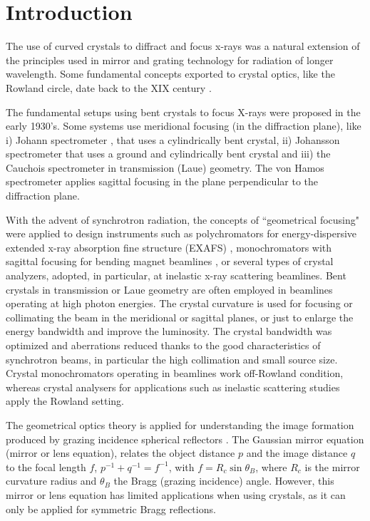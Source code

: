 \documentclass[preprint]{iucr}              %
\begin{document}
\section{Introduction}

The use of curved crystals to diffract and focus x-rays was a natural extension of the principles used in mirror and grating technology for radiation of longer wavelength. Some fundamental concepts exported to crystal optics, like the Rowland circle, date back to the XIX century \cite{rowland1882}.

The fundamental setups using bent crystals to focus X-rays were proposed in the early 1930’s. Some systems use meridional focusing (in the diffraction plane), like i) Johann spectrometer \cite{Johann1931}, that uses a cylindrically bent crystal,  ii) Johansson spectrometer \cite{Johansson1933} that uses a ground and cylindrically bent crystal and iii) the Cauchois spectrometer \cite{cauchois1933} in transmission (Laue) geometry. The von Hamos spectrometer \cite{V.Hamos1933} applies sagittal focusing in the plane perpendicular to the diffraction plane.

With the advent of synchrotron radiation, the concepts of ``geometrical focusing" were applied to design instruments such as polychromators for energy-dispersive extended x-ray absorption fine structure (EXAFS) \cite{Tolentino:ms0206}, monochromators with sagittal focusing for bending magnet beamlines \cite{Sparks1980}, or several types of crystal analyzers, adopted, in particular, at inelastic x-ray scattering beamlines. Bent crystals in transmission or Laue geometry are often employed in beamlines operating at high photon energies. The crystal curvature is used for focusing or collimating the beam in the meridional \cite{Suortti1988,SuorttiShulze} or sagittal \cite{Zhong2001} planes, or just to enlarge the energy bandwidth and improve the luminosity. The crystal bandwidth was optimized and aberrations reduced thanks to the good characteristics of synchrotron beams, in particular the high collimation and small source size. Crystal monochromators operating in beamlines work off-Rowland condition, whereas crystal analysers for applications such as inelastic scattering studies apply the Rowland setting.

The geometrical optics theory is applied for understanding the image formation produced by grazing incidence spherical reflectors \cite{KB1948}. The Gaussian mirror equation (mirror or lens equation), relates the object distance $p$ and the image distance $q$ to the focal length $f$, $p^{-1}+q^{-1}=f^{-1}$, with $f=R_c \sin\theta_B$, where $R_c$ is the mirror curvature radius and $\theta_B$ the Bragg (grazing incidence) angle. However, this mirror or lens equation has limited applications when using crystals, as it can only be applied for symmetric Bragg reflections.
\end{document}
